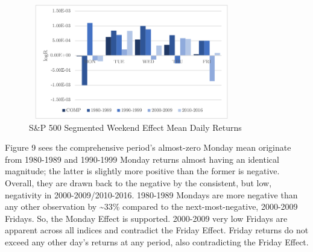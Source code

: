 \documentclass[11pt, english]{article}
\begin{document}
	\begin{figure}[H]
        \begin{center}
                \includegraphics[width=9cm,height=5cm]{SP-WE2.png} 
                \caption{S\&P 500 Segmented Weekend Effect Mean Daily Returns}
        \end{center}
        \end{figure}
	
	Figure 9 sees the comprehensive period’s almost-zero Monday mean originate from 1980-1989 and 1990-1999 Monday returns almost having an identical magnitude; the latter is slightly more positive than the former is negative. Overall, they are drawn back to the negative by the consistent, but low, negativity in 2000-2009/2010-2016. 1980-1989 Mondays are more negative than any other observation by \~{}33\% compared to the next-most-negative, 2000-2009 Fridays. So, the Monday Effect is supported. 2000-2009 very low Fridays are apparent across all indices and contradict the Friday Effect. Friday returns do not exceed any other day’s returns at any period, also contradicting the Friday Effect.

	\newpage
\end{document}
